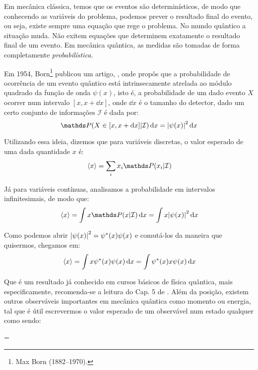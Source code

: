     Em mecânica clássica, temos que os eventos são determinísticos, de modo que conhecendo as variáveis do problema, podemos prever o resultado final do evento, ou seja, existe sempre uma equação que rege o problema. No mundo quântico a situação muda. Não exitem equações que determinem exatamente o resultado final de um evento. Em mecânica quântica, as medidas são tomadas de forma completamente \textit{probabilística}.
    
    Em 1954, Born\footnote{Max Born (1882--1970).} publicou um artigo, \textcite{Born}, onde propôs que a probabilidade de ocorrência de um evento quântico está intrinsecamente atrelada ao módulo quadrado da função de onda $\psi(x)$, isto é, a probabilidade de um dado evento $X$ ocorrer num intervalo $[x,x+\dd{x}]$, onde $\dd{x}$ é o tamanho do detector, dado um certo conjunto de informações $\mathcal{I}$ é dada por:
        \begin{equation*}
            \prob{X\in[x,x+\dd{x}]}{\mathcal{I}}\dd{x} = \abs{\psi(x)}^2\dd{x}
        \end{equation*}
    
    Utilizando essa ideia, dizemos que para variáveis discretas, o valor esperado de uma dada quantidade $x$ é:
        \begin{equation*}
            \expval*{x} = \sum_{i}x_{i}\prob{x_{i}}{\mathcal{I}}
        \end{equation*}
    
    Já para variáveis contínuas, analisamos a probabilidade em intervalos infinitesimais, de modo que:
        \begin{equation*}
            \expval*{x} = \int x\prob{x}{\mathcal{I}}\dd{x} = \int x\abs{\psi(x)}^2\dd{x}
        \end{equation*}
    
    Como podemos abrir $\abs{\psi(x)}^2 = \psi^{\ast}(x)\psi(x)$ e comutá-los da maneira que quisermos, chegamos em:
        \begin{equation*}
            \expval*{x} = \int x\psi^{\ast}(x)\psi(x)\dd{x} = \int\psi^{\ast}(x)x\psi(x)\dd{x}
        \end{equation*}
    
    Que é um resultado já conhecido em cursos básicos de física quântica, mais especificamente, recomenda-se a leitura do Cap. 5 de \textcite{Eisberg}. Além da posição, existem outros observáveis importantes em mecânica quântica como momento ou energia, tal que é útil escrevermos o valor esperado de um observável num estado qualquer como sendo:
        \begin{answer}\label{eq: expected value of an observable}
             = \bra{\psi}\ket{\psi}
        \end{answer}
    
